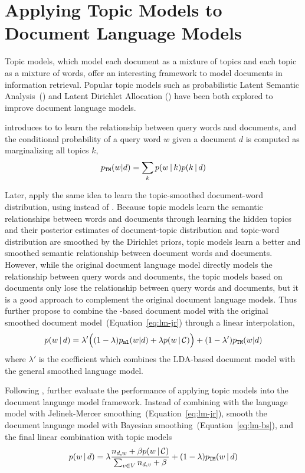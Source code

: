\section{Applying Topic Models to Document Language Models}

Topic models, which model each document as a mixture of topics and
each topic as a mixture of words, offer an interesting framework to
model documents in information retrieval. Popular topic models such as
probabilistic Latent Semantic Analysis~() and Latent Dirichlet Allocation ()
have been both explored to improve document language models.

\citet{hofmann-99a} introduces  to
to learn the relationship between query words and documents,
and the conditional probability of a query word $w$ given a document $d$ is
computed as marginalizing all topics $k$,
\begin{align}
p_{\texttt{TM}}(w|d) = \sum_{k} p(w \, | \, k) p(k \, | \, d)
\end{align}

Later, \citet{wei-06} apply the same idea to learn the topic-smoothed document-word
distribution, using  instead of .
Because topic models learn the semantic relationships between words
and documents through learning the hidden topics and their posterior
estimates of document-topic distribution and topic-word distribution
are smoothed by the Dirichlet priors, topic models learn a better and
smoothed semantic relationship between document words and documents. However,
while the original document language model directly models the relationship
between query words and documents, the topic models based on documents only 
lose the relationship between query words and documents,
but it is a good approach to complement the original document
language models. Thus \citet{wei-06} further propose to combine the
-based document model with the original smoothed document
model~(Equation~\ref{eq:lm-jr}) through a linear interpolation,
\begin{align}
p(w \, | \, d) = \lambda' \Big( (1 - \lambda) p_{\texttt{ml}}(w|d) + \lambda
p(w \, | \, \mathcal{C}) \Big) + (1 - \lambda') p_{\texttt{TM}}(w|d)
\end{align}
where $\lambda'$ is the coefficient which combines the LDA-based
document model with the general smoothed language model.

Following \citet{wei-06}, \citet{Lu-2011} further evaluate the
performance of applying topic models into the document language model
framework. Instead of combining with the language model with
Jelinek-Mercer smoothing~(Equation~\ref{eq:lm-jr}), \citet{Lu-2011}
smooth the document language model with Bayesian
smoothing~(Equation~\ref{eq:lm-bs}), and the final linear combination
with topic models
\begin{align}
p(w \, | \, d) = \lambda \frac{n_{d,w} + \beta p(w \, | \, \mathcal{C})}{\sum_{v
  \in V} n_{d,v} + \beta}  + (1 - \lambda) p_{\texttt{TM}}(w \, | \, d)
\end{align}

